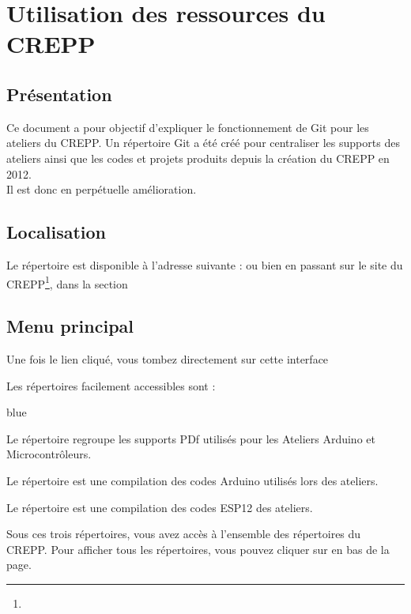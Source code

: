 
\chapter{Utilisation des ressources du CREPP}

\section{Présentation}

Ce document a pour objectif d'expliquer le fonctionnement de Git pour les ateliers du CREPP.
Un répertoire Git a été créé pour centraliser les supports des ateliers ainsi que les codes et projets produits depuis la création du CREPP en 2012.\\
Il est donc en perpétuelle amélioration.

\section{Localisation}
Le répertoire est disponible à l'adresse suivante :  ou bien en passant sur
 le site du CREPP\footnote{}, dans la section 


\section{Menu principal}


Une fois le lien cliqué, vous tombez directement sur cette interface 


Les répertoires facilement accessibles sont :

\begin{items}{blue}{\Bullet}
    \item Le répertoire  regroupe les supports PDf utilisés pour les Ateliers Arduino et Microcontrôleurs.
    \item Le répertoire  est une compilation des codes Arduino utilisés lors des ateliers.
    \item Le répertoire  est une compilation des codes ESP12 des ateliers.
\end{items}

Sous ces trois répertoires, vous avez accès à l'ensemble des répertoires du CREPP. Pour afficher tous les répertoires, vous pouvez cliquer 
sur  en bas de la page.


